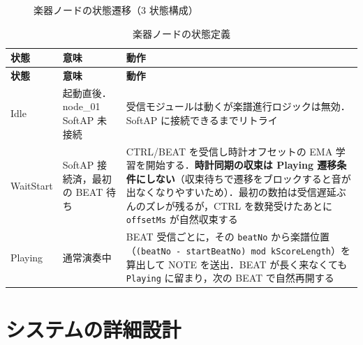 \documentclass[lualatex,book,paper=a4paper,jafontsize=11.5pt,jafontscale=1.05]{jlreq}
\begin{document}
\begin{figure}[H]
\centering
{}
\caption{楽器ノードの状態遷移（3 状態構成）}\label{fig:state-performer}
\end{figure}

\begin{longtable}{p{} p{} p{}}
\caption{楽器ノードの状態定義}\label{tab:state-performer}\\
\toprule
\textbf{状態} & \textbf{意味} & \textbf{動作} \\
\midrule
\endfirsthead
\toprule
\textbf{状態} & \textbf{意味} & \textbf{動作} \\
\midrule
\endhead
Idle      & 起動直後．node\_01 SoftAP 未接続 & 受信モジュールは動くが楽譜進行ロジックは無効．SoftAP に接続できるまでリトライ \\
WaitStart & SoftAP 接続済，最初の BEAT 待ち & CTRL/BEAT を受信し時計オフセットの EMA 学習を開始する．\textbf{時計同期の収束は Playing 遷移条件にしない}（収束待ちで遷移をブロックすると音が出なくなりやすいため）．最初の数拍は受信遅延ぶんのズレが残るが，CTRL を数発受けたあとに \texttt{offsetMs} が自然収束する \\
Playing   & 通常演奏中                 & BEAT 受信ごとに，その \texttt{beatNo} から楽譜位置（\texttt{(beatNo - startBeatNo) mod kScoreLength}）を算出して NOTE を送出．BEAT が長く来なくても \texttt{Playing} に留まり，次の BEAT で自然再開する \\
\bottomrule
\end{longtable}


\chapter{システムの詳細設計}
\end{document}
